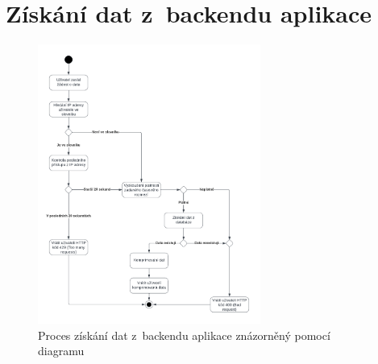 \chapter{Získání dat z~backendu aplikace}

\begin{figure}[h]
	\centering
	\includegraphics[width=0.65\textwidth]{Pictures/diagram1.pdf}
	\caption{Proces získání dat z~backendu aplikace znázorněný pomocí diagramu}
	\label{fig:Diagram1}
\end{figure}

\endinput